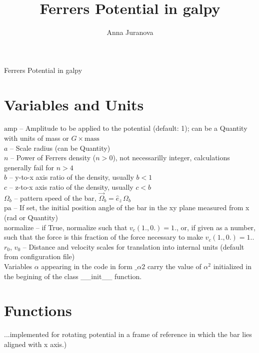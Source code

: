 \documentclass[a4paper,11pt]{article}
\author{Anna Juranova}
\title{Ferrers Potential in galpy}
\begin{document}
	
	\begin{center}
		\huge{Ferrers Potential in galpy}\\
	\end{center}

	\section{Variables and Units}
           $ \mathrm{amp} $ -- Amplitude to be applied to the potential (default: 1); can be a Quantity with units of mass or $ G \times \mathrm{mass} $\\
           $ a $ -- Scale radius (can be Quantity)\\
           $ n $ -- Power of Ferrers density ($ n > 0 $), not necessarilly integer, calculations generally fail for $ n > 4 $\\
           $ b $ -- y-to-x axis ratio of the density, usually $ b < 1 $\\
           $ c $ -- z-to-x axis ratio of the density, usually $ c < b $\\
           $ \Omega_b $ -- pattern speed of the bar, $ \vec{\Omega}_b = \hat{e}_z\,\Omega_b $\\
           $ \mathrm{pa} $ -- If set, the initial position angle of the bar in the xy plane measured from x (rad or Quantity)\\
           normalize -- if True, normalize such that $ v_c(1.,0.)=1. $, or, if given as a number, such that the force is this fraction of the force necessary to make $ v_c(1.,0.)=1. $.\\
           $ r_0 $, $ v_0 $ -- Distance and velocity scales for translation into internal units (default from configuration file)\\
           Variables $ \alpha $	appearing in the code in form $ \_\alpha2 $ carry the value of $ \alpha^2 $ initialized in the begining of the class \_\_init\_\_ function.

	\section{Functions}
	 ...implemented for rotating potential in a frame of reference in which the bar lies aligned with x axis.)
		 
\end{document}
